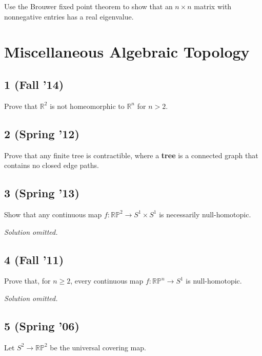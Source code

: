 Use the Brouwer fixed point theorem to show that an \(n \times n\)
matrix with nonnegative entries has a real eigenvalue.

\hypertarget{miscellaneous-algebraic-topology}{%
\section{Miscellaneous Algebraic
Topology}\label{miscellaneous-algebraic-topology}}

\hypertarget{fall-14-8}{%
\subsection{1 (Fall '14)}\label{fall-14-8}}

Prove that \({\mathbb{R}}^2\) is not homeomorphic to \({\mathbb{R}}^n\)
for \(n > 2\).

\hypertarget{spring-12-4}{%
\subsection{2 (Spring '12)}\label{spring-12-4}}

Prove that any finite tree is contractible, where a \textbf{tree} is a
connected graph that contains no closed edge paths.

\hypertarget{spring-13-5}{%
\subsection{3 (Spring '13)}\label{spring-13-5}}

Show that any continuous map \(f : {\mathbb{RP}}^2 \to S^1 \times S^1\)
is necessarily null-homotopic.

\emph{Solution omitted.}

\hypertarget{fall-11-4}{%
\subsection{4 (Fall '11)}\label{fall-11-4}}

Prove that, for \(n \geq 2\), every continuous map
\(f: {\mathbb{RP}}^n \to S^1\) is null-homotopic.

\emph{Solution omitted.}

\hypertarget{spring-06-6}{%
\subsection{5 (Spring '06)}\label{spring-06-6}}

Let \(S^2 \to {\mathbb{RP}}^2\) be the universal covering map.

